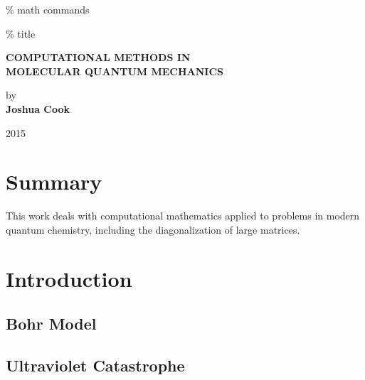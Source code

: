 \documentclass[12pt,]{book}
\date{}
\begin{document}
\% math commands

\% title

\begin{titlepage}
    \begin{center}
           
       \large{ \textbf{ \uppercase{Computational Methods in \\ Molecular Quantum Mechanics}}}
        
        \vspace{0.5cm}
        
        \vspace{1.5cm}
        
        \vspace{0.8cm}        
         
        by\\        
        \textbf{Joshua Cook}           
       

        
        
        \vfill
  
        2015
        
 
 
     \end{center}
    \thispagestyle{empty}
\end{titlepage}

\newpage

\thispagestyle{empty} \mbox{}

\chapter{Summary}\label{summary}

This work deals with computational mathematics applied to problems in
modern quantum chemistry, including the diagonalization of large
matrices.

\tableofcontents

\chapter{Introduction}\label{introduction}

\section{Bohr Model}\label{bohr-model}

\section{Ultraviolet Catastrophe}\label{ultraviolet-catastrophe}
\end{document}
